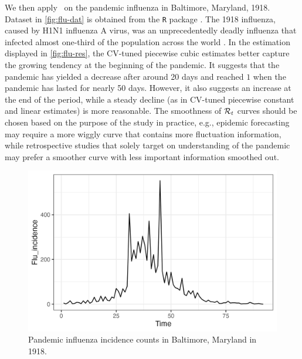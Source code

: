 We then apply \RtEstim\ on the pandemic influenza in Baltimore, Maryland, 1918. Dataset in \autoref{fig:flu-dat} is obtained from the \texttt{R} package \EpiEstim. The 1918 influenza, caused by H1N1 influenza A virus, was an unprecedentedly deadly influenza that infected almost one-third of the population across the world \citep{taubenberger20061918}. 
In the estimation displayed in \autoref{fig:flu-res}, the CV-tuned piecewise cubic estimates better capture the growing tendency at the beginning of the pandemic. It suggests that the pandemic has yielded a decrease after around 20 days and reached $1$ when the pandemic has lasted for nearly 50 days. However, it also suggests an increase at the end of the period, while a steady decline (as in CV-tuned piecewise constant and linear estimates) is more reasonable. The smoothness of $\mathcal{R}_t$ curves should be chosen based on the purpose of the study in practice, e.g., epidemic forecasting may require a more wiggly curve that contains more fluctuation information, while retrospective studies that solely target on understanding of the pandemic may prefer a smoother curve with less important information smoothed out. 
\begin{figure}[tb]
    \centering
    \includegraphics[width=0.9\linewidth]{fig/flu_dat.png}
    \caption{Pandemic influenza incidence counts in Baltimore, Maryland in 1918.} 
    \label{fig:flu-dat}
\end{figure} 

